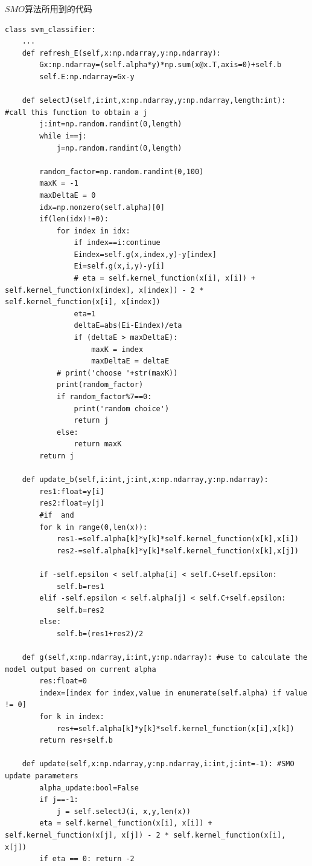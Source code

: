 \documentclass{article}
\begin{document}
$SMO$算法所用到的代码
\begin{verbatim}
class svm_classifier:
    ...
    def refresh_E(self,x:np.ndarray,y:np.ndarray):
        Gx:np.ndarray=(self.alpha*y)*np.sum(x@x.T,axis=0)+self.b
        self.E:np.ndarray=Gx-y

    def selectJ(self,i:int,x:np.ndarray,y:np.ndarray,length:int): #call this function to obtain a j
        j:int=np.random.randint(0,length)
        while i==j:
            j=np.random.randint(0,length)

        random_factor=np.random.randint(0,100)
        maxK = -1
        maxDeltaE = 0
        idx=np.nonzero(self.alpha)[0]
        if(len(idx)!=0):
            for index in idx:
                if index==i:continue
                Eindex=self.g(x,index,y)-y[index]
                Ei=self.g(x,i,y)-y[i]
                # eta = self.kernel_function(x[i], x[i]) + self.kernel_function(x[index], x[index]) - 2 * self.kernel_function(x[i], x[index])
                eta=1
                deltaE=abs(Ei-Eindex)/eta
                if (deltaE > maxDeltaE):
                    maxK = index
                    maxDeltaE = deltaE
            # print('choose '+str(maxK))
            print(random_factor)
            if random_factor%7==0:
                print('random choice')
                return j
            else:
                return maxK
        return j

    def update_b(self,i:int,j:int,x:np.ndarray,y:np.ndarray):
        res1:float=y[i]
        res2:float=y[j]
        #if  and
        for k in range(0,len(x)):
            res1-=self.alpha[k]*y[k]*self.kernel_function(x[k],x[i])
            res2-=self.alpha[k]*y[k]*self.kernel_function(x[k],x[j])

        if -self.epsilon < self.alpha[i] < self.C+self.epsilon:
            self.b=res1
        elif -self.epsilon < self.alpha[j] < self.C+self.epsilon:
            self.b=res2
        else:
            self.b=(res1+res2)/2

    def g(self,x:np.ndarray,i:int,y:np.ndarray): #use to calculate the model output based on current alpha
        res:float=0
        index=[index for index,value in enumerate(self.alpha) if value != 0]
        for k in index:
            res+=self.alpha[k]*y[k]*self.kernel_function(x[i],x[k])
        return res+self.b

    def update(self,x:np.ndarray,y:np.ndarray,i:int,j:int=-1): #SMO update parameters
        alpha_update:bool=False
        if j==-1:
            j = self.selectJ(i, x,y,len(x))
        eta = self.kernel_function(x[i], x[i]) + self.kernel_function(x[j], x[j]) - 2 * self.kernel_function(x[i], x[j])
        if eta == 0: return -2


\end{verbatim}
\end{document}

